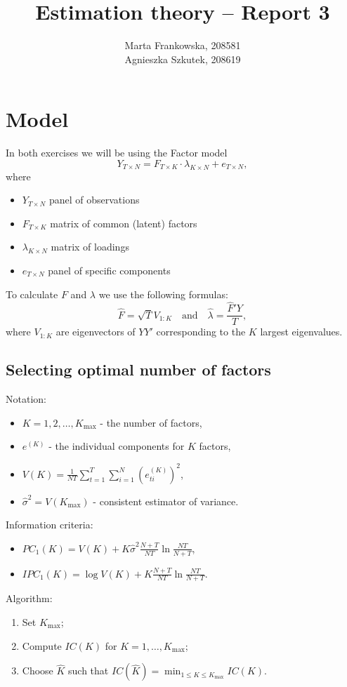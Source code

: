 \documentclass[12pt, a4paper]{article}\usepackage[]{graphicx}\usepackage[]{color}
\begin{document}
\title{Estimation theory -- Report 3}
\author{Marta Frankowska, 208581 \\ Agnieszka Szkutek, 208619}
\maketitle
\tableofcontents 


\section{Model}
In both exercises we will be using the Factor model
\[ Y_{T\times N} = F_{T\times K} \cdot \lambda_{K\times N} + e_{T\times N},\]
where 
\begin{itemize}
  \item $Y_{T\times N}$ panel of observations
  \item $F_{T\times K}$ matrix of common (latent) factors
  \item $\lambda_{K\times N}$ matrix of loadings
  \item $e_{T\times N}$ panel of specific components
\end{itemize}

To calculate $F$ and $\lambda$ we use the following formulas:
\[ \hat{F} = \sqrt{T} V_{1:K} \quad\text{and}\quad \hat{\lambda} = \frac{\hat{F}' Y}{T},\]
where $V_{1:K}$ are eigenvectors of $YY'$ corresponding to the $K$ largest eigenvalues.


\subsection{Selecting optimal number of factors}
Notation:
\begin{itemize}
  \item $K = 1,2,\dots,K_\text{max}$ - the number of factors,
  \item $e^{(K)}$ - the individual components for $K$ factors,
  \item $V(K) = \frac{1}{NT}\sum_{t=1}^{T} \sum_{i=1}^{N} \left( e^{(K)}_{t i} \right)^2$,
  \item $\hat{\sigma}^2 = V(K_\text{max})$ - consistent estimator of variance.
\end{itemize}
Information criteria:
\begin{itemize}
  \item $PC_1(K) = V(K) + K \hat{\sigma}^2 \frac{N+T}{NT} \ln{\frac{NT}{N+T}}$,
  \item $IPC_1(K) = \log{V(K)} + K\frac{N+T}{NT} \ln{\frac{NT}{N+T}}$.
\end{itemize}
Algorithm:
\begin{enumerate}
	\item Set $K_\text{max}$;
	\item Compute $IC(K)$ for $K = 1,\dots,K_\text{max}$;
	\item Choose $\hat{K}$ such that $IC(\hat{K}) = \min_{1\leq K\leq K_\text{max}} IC(K)$.
\end{enumerate}
\end{document}
